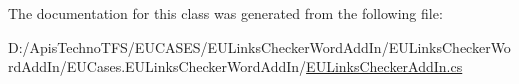 The documentation for this class was generated from the following file\+:\begin{DoxyCompactItemize}
\item 
D\+:/\+Apis\+Techno\+T\+F\+S/\+E\+U\+C\+A\+S\+E\+S/\+E\+U\+Links\+Checker\+Word\+Add\+In/\+E\+U\+Links\+Checker\+Word\+Add\+In/\+E\+U\+Cases.\+E\+U\+Links\+Checker\+Word\+Add\+In/\hyperlink{_e_u_links_checker_add_in_8cs}{E\+U\+Links\+Checker\+Add\+In.\+cs}\end{DoxyCompactItemize}

